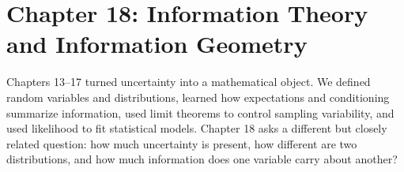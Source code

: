 \section{Chapter 18: Information Theory and Information Geometry}
\label{ch:information-theory-information-geometry}

Chapters 13--17 turned uncertainty into a mathematical object. We defined random variables and distributions, learned how expectations and conditioning summarize information, used limit theorems to control sampling variability, and used likelihood to fit statistical models. Chapter 18 asks a different but closely related question: how much uncertainty is present, how different are two distributions, and how much information does one variable carry about another?

